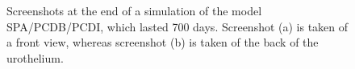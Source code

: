 \begin{figure}[ht]
\begin{center}
\end{center}
\begin{center}
\end{center}
\caption[Simulated urothel with the model SPA/PCDB/PCDI at day 700]{\label{img:720daysScreenshotSPA/BCPD/IPCD}Screenshots at the end of a simulation of the model SPA/PCDB/PCDI, which lasted 700 days. Screenshot (a) is taken of a front view, whereas screenshot (b) is taken of the back of the urothelium.}

\end{figure}



